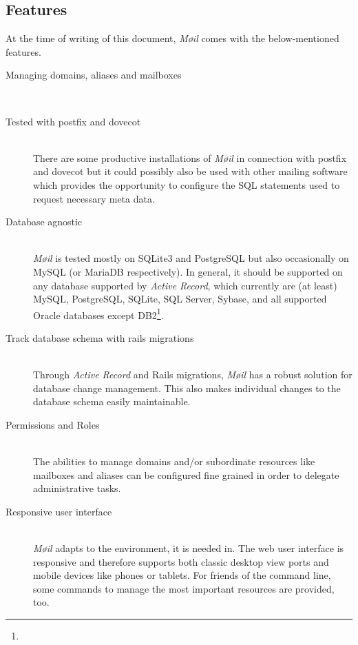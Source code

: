 \documentclass[12pt,a4paper]{scrartcl}
\begin{document}


		\subsection*{Features}
		\label{sec:moeil:features}
			At the time of writing of this document, \emph{Møil} comes with the
			below-mentioned features.

			\begin{description}
				\item[\rm Managing domains, aliases and mailboxes]\ \\
					\todo

				\item[\rm Tested with postfix and dovecot]\ \\
					There are some productive installations of \emph{Møil} in
					connection with postfix and dovecot but it could possibly
					also be used with other mailing software which provides the
					opportunity to configure the \ac{SQL} statements used to
					request necessary meta data.
				
				\item[\rm Database agnostic]\ \\
					\emph{Møil} is tested mostly on SQLite3 and PostgreSQL but
					also occasionally on MySQL (or MariaDB respectively). In
					general, it should be supported on any database supported
					by \emph{Active Record}, which currently are (at least)
					MySQL, PostgreSQL, SQLite, SQL Server, Sybase, and all
					supported Oracle databases except
					DB2\footnote{\urlARSupport}.

				\item[\rm Track database schema with rails migrations]\ \\
					Through \emph{Active Record} and \ac{Rails} migrations,
					\emph{Møil} has a robust solution for database change
					management. This also makes individual changes to the
					database schema easily maintainable.

				\item[\rm Permissions and Roles]\ \\
					The abilities to manage domains and/or subordinate
					resources like mailboxes and aliases can be configured fine
					grained in order to delegate administrative tasks.

				\item[\rm Responsive user interface]\ \\
					\emph{Møil} adapts to the environment, it is needed in. The
					web user interface is responsive and therefore supports
					both classic desktop view ports and mobile devices like
					phones or tablets. For friends of the command line, some
					commands to manage the most important resources are
					provided, too.


\end{description}
\end{document}
